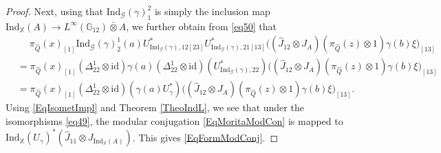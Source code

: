\documentclass[10pt,a4paper]{amsart}
\newcommand{\G}{\mathbb{G}}
\newcommand{\Ind}{\mathrm{Ind}}
\newcommand{\X}{\mathbb{X}}
\newcommand{\id}{\mathrm{id}}
\newcommand{\msG}{\mathscr{G}}
\begin{document}
\begin{proof}
Next, using that $\Ind_{\msG}(\gamma)^2_1$ is simply the inclusion map $\Ind_{\X}(A)\rightarrow L^{\infty}(\G_{12})\bar\otimes A$, we further obtain from \eqref{eq50} that
\[\begin{split}
&\quad\;
\pi_{\hat{Q}}(x)_{[1]}
\Ind_{\msG}(\gamma)_2^1 (a)
U^*_{\Ind_{\msG}(\gamma),12 [23]}
U^*_{\Ind_{\msG}(\gamma),21[13]}
\bigl(
(\hat{J}_{12}\otimes J_A)
(\pi_{\hat{Q}}(z)\otimes 1)
\gamma(b) \xi
\bigr)_{[13]}\\
&=
\pi_{\hat{Q}}(x)_{[1]}
(\Delta^1_{22}\otimes \id)\gamma(a)
(\Delta_{22}^1\otimes \id)(U^*_{\Ind_{\msG}(\gamma),22})
\bigl(
(\hat{J}_{12}\otimes J_A)
(\pi_{\hat{Q}}(z)\otimes 1)
\gamma(b) \xi
\bigr)_{[13]}\\
&=
\pi_{\hat{Q}}(x)_{[1]}
(\Delta^1_{22}\otimes \id)(\gamma(a)
U^*_{\gamma})
\bigl(
(\hat{J}_{12}\otimes J_A)
(\pi_{\hat{Q}}(z)\otimes 1)
\gamma(b) \xi
\bigr)_{[13]}.
\end{split}\]
Using \eqref{EqIsometImpl} and Theorem \ref{TheoIndL}, we see that under the isomorphisms \eqref{eq49}, the modular conjugation \eqref{EqMoritaModCon} is mapped to $\Ind_{\X}(U_{\gamma})^*(\hat{J}_{11}\otimes J_{\Ind_{\X}(A)})$. This gives \eqref{EqFormModConj}.
\end{proof}
\end{document}
